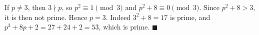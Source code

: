 If $p\ne3$, then $3\nmid p$, so $p^2\equiv1\pmod3$ and $p^2+8\equiv0\pmod3$. Since $p^2+8>3$, it is then not prime. Hence $p=3$. Indeed $3^2+8=17$ is prime, and $p^3+8p+2=27+24+2=53$, which is prime. $\blacksquare$
